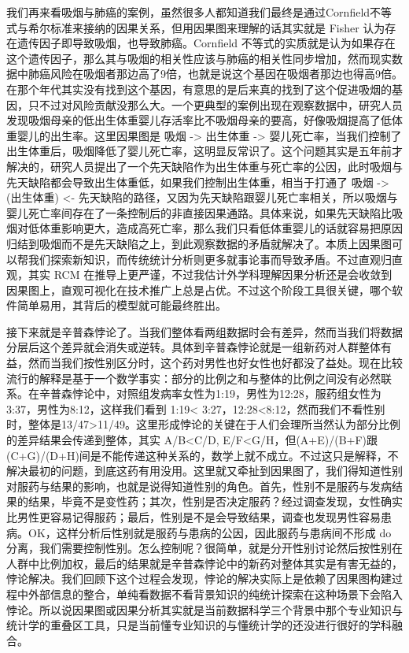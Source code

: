 \documentclass[]{tufte-book}
\begin{document}
我们再来看吸烟与肺癌的案例，虽然很多人都知道我们最终是通过Cornfield不等式与希尔标准来接纳的因果关系，但用因果图来理解的话其实就是 Fisher 认为存在遗传因子即导致吸烟，也导致肺癌。Cornfield 不等式的实质就是认为如果存在这个遗传因子，那么其与吸烟的相关性应该与肺癌的相关性同步增加，然而现实数据中肺癌风险在吸烟者那边高了9倍，也就是说这个基因在吸烟者那边也得高9倍。在那个年代其实没有找到这个基因，有意思的是后来真的找到了这个促进吸烟的基因，只不过对风险贡献没那么大。一个更典型的案例出现在观察数据中，研究人员发现吸烟母亲的低出生体重婴儿存活率比不吸烟母亲的要高，好像吸烟提高了低体重婴儿的出生率。这里因果图是 吸烟 -\textgreater{} 出生体重 -\textgreater{} 婴儿死亡率，当我们控制了出生体重后，吸烟降低了婴儿死亡率，这明显反常识了。这个问题其实是五年前才解决的，研究人员提出了一个先天缺陷作为出生体重与死亡率的公因，此时吸烟与先天缺陷都会导致出生体重低，如果我们控制出生体重，相当于打通了 吸烟 -\textgreater{} (出生体重) \textless- 先天缺陷的路径，又因为先天缺陷跟婴儿死亡率相关，所以吸烟与婴儿死亡率间存在了一条控制后的非直接因果通路。具体来说，如果先天缺陷比吸烟对低体重影响更大，造成高死亡率，那么我们只看低体重婴儿的话就容易把原因归结到吸烟而不是先天缺陷之上，到此观察数据的矛盾就解决了。本质上因果图可以帮我们探索新知识，而传统统计分析则更多就事论事而导致矛盾。不过直观归直观，其实 RCM 在推导上更严谨，不过我估计外学科理解因果分析还是会收敛到因果图上，直观可视化在技术推广上总是占优。不过这个阶段工具很关键，哪个软件简单易用，其背后的模型就可能最终胜出。

接下来就是辛普森悖论了。当我们整体看两组数据时会有差异，然而当我们将数据分层后这个差异就会消失或逆转。具体到辛普森悖论就是一组新药对人群整体有益，然而当我们按性别区分时，这个药对男性也好女性也好都没了益处。现在比较流行的解释是基于一个数学事实：部分的比例之和与整体的比例之间没有必然联系。在辛普森悖论中，对照组发病率女性为1:19，男性为12:28，服药组女性为3:37，男性为8:12，这样我们看到 1:19\textless{} 3:27，12:28\textless8:12，然而我们不看性别时，整体是13/47\textgreater11/49。这里形成悖论的关键在于人们会理所当然认为部分比例的差异结果会传递到整体，其实 A/B\textless C/D, E/F\textless G/H，但(A+E)/(B+F)跟(C+G)/(D+H)间是不能传递这种关系的，数学上就不成立。不过这只是解释，不解决最初的问题，到底这药有用没用。这里就又牵扯到因果图了，我们得知道性别对服药与结果的影响，也就是说得知道性别的角色。首先，性别不是服药与发病结果的结果，毕竟不是变性药；其次，性别是否决定服药？经过调查发现，女性确实比男性更容易记得服药；最后，性别是不是会导致结果，调查也发现男性容易患病。OK，这样分析后性别就是服药与患病的公因，因此服药与患病间不形成 do 分离，我们需要控制性别。怎么控制呢？很简单，就是分开性别讨论然后按性别在人群中比例加权，最后的结果就是辛普森悖论中的新药对整体其实是有害无益的，悖论解决。我们回顾下这个过程会发现，悖论的解决实际上是依赖了因果图构建过程中外部信息的整合，单纯看数据不看背景知识的纯统计探索在这种场景下会陷入悖论。所以说因果图或因果分析其实就是当前数据科学三个背景中那个专业知识与统计学的重叠区工具，只是当前懂专业知识的与懂统计学的还没进行很好的学科融合。
\end{document}
